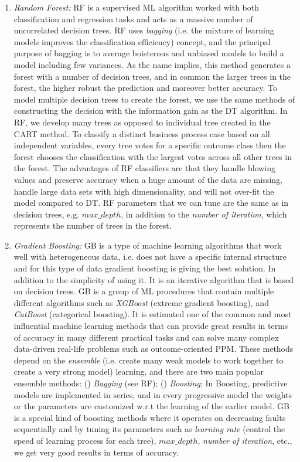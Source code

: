 \begin{enumerate}
	\item \textit{Random Forest:} RF is a supervised ML algorithm worked with both classification and regression tasks and acts as a massive number of uncorrelated decision trees. RF uses \textit{bagging} (i.e. the mixture of learning models improves the classification efficiency) concept, and the principal purpose of bagging is to average boisterous and unbiased models to build a model including few variances. As the name implies, this method generates a forest with a number of decision trees, and in common the larger trees in the forest, the higher robust the prediction and moreover better accuracy. To model multiple decision trees to create the forest, we use the same methods of constructing the decision with the information gain as the DT algorithm.  In RF, we develop many trees as opposed to individual tree created in the CART method. To classify a distinct business process case based on all independent variables, every tree votes for a specific outcome class then the forest chooses the classification with the largest votes across all other trees in the forest. The advantages of RF classifiers are that they handle blowing values and preserve accuracy when a huge amount of the data are missing, handle large data sets with high dimensionality, and will not over-fit the model compared to DT. RF parameters that we can tune are the same as in decision trees, e.g. $max\_depth$, in addition to the \textit{number of iteration}, which represents the number of trees in the forest.
	
	
	
	
	\item \textit{Gradient Boosting:} GB is a type of machine learning algorithms that work well with heterogeneous data, i.e. does not have a specific internal structure and for this type of data gradient boosting is giving the best solution. In addition to the simplicity of using it. It is an iterative algorithm that is based on decision trees. GB is a group of ML procedures that contain multiple different algorithms such as \textit{XGBoost} (extreme gradient boosting), and \textit{CatBoost} (categorical boosting). It is estimated one of the common and most influential machine learning methods that can provide great results in terms of accuracy in many different practical tasks and can solve many complex data-driven real-life problems such as outcome-oriented PPM. These methods depend on the \textit{ensemble} (i.e. create many weak models to work together to create a very strong model) learning, and there are two main popular ensemble methods: () \textit{Bagging} (see RF); () \textit{Boosting}; In Boosting, predictive models are implemented in series, and in every progressive model the weights or the parameters are customized w.r.t the learning of the earlier model. GB is a special kind of boosting methods where it operates on decreasing faults sequentially and by tuning its parameters such as \textit{learning rate} (control the speed of learning process for each tree), $max\_depth$, \textit{number of iteration}, etc., we get very good results in terms of accuracy.  
	

\end{enumerate}

